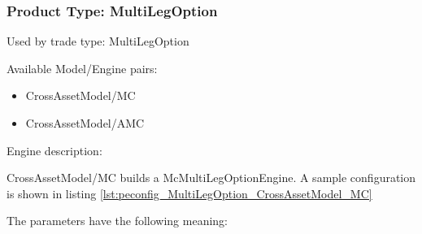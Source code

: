 \subsubsection{Product Type: MultiLegOption}

Used by trade type: MultiLegOption

Available Model/Engine pairs:

\begin{itemize}
\item CrossAssetModel/MC
\item CrossAssetModel/AMC
\end{itemize}

Engine description:

CrossAssetModel/MC builds a McMultiLegOptionEngine. A sample configuration is shown in listing
\ref{lst:peconfig_MultiLegOption_CrossAssetModel_MC}

The parameters have the following meaning:

